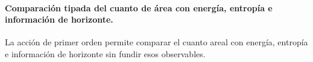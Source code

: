 \begin{HMTScientificOwnerSubordinated}

\end{HMTScientificOwnerSubordinated}

\paragraph{Comparación tipada del cuanto de área con energía, entropía e información de horizonte.} La acción de primer orden permite comparar el cuanto areal con energía, entropía e información de horizonte sin fundir esos observables.
